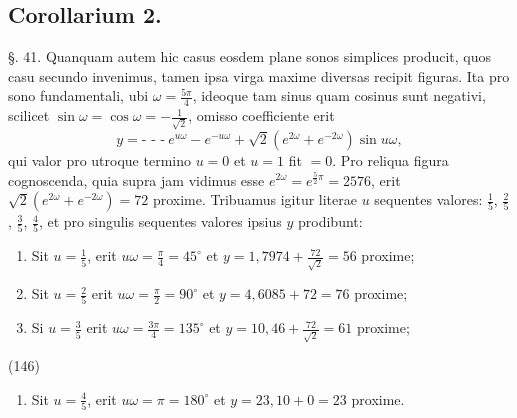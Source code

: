 \documentclass[11pt,a4paper]{article}
\begin{document}
\subsection{Corollarium 2.}

§. 41. Quanquam autem hic casus eosdem plane sonos simplices
producit, quos casu secundo invenimus, tamen ipsa virga maxime
diversas recipit figuras. Ita pro sono fundamentali, ubi $\omega=\frac{5\pi}{4}$,
ideoque tam sinus quam cosinus sunt negativi, scilicet $\sin \omega=\cos\omega
=-\frac{1}{\surd 2}$, omisso coefficiente erit
\[ y=\text{- - -}\ e^{u\omega}-e^{-u\omega}+\surd 2(e^{2\omega}+e^{-2\omega})\sin u\omega, \]
qui valor pro utroque termino $u=0$ et $u=1$ fit $=0$.
Pro reliqua figura cognoscenda, quia supra jam vidimus
esse $e^{2\omega}=e^{\frac{5}{2}\pi}=2576$, erit $\surd 2(e^{2\omega}+e^{-2\omega})=72$ proxime. Tribuamus
igitur literae $u$ sequentes valores: $\frac{1}{5}$, $\frac{2}{5}$, $\frac{3}{5}$, $\frac{4}{5}$, et pro singulis
sequentes valores ipsius $y$ prodibunt:

\begin{enumerate}
\item[I.] Sit $u=\frac{1}{5}$, erit $u\omega=\frac{\pi}{4}=45^{\circ}$ et $y=1,7974+\frac{72}{\surd 2}=56$ proxime;
\item[II.] Sit $u=\frac{2}{5}$ erit $u\omega=\frac{\pi}{2}=90^{\circ}$ et $y=4,6085+72=76$ proxime;
\item[III.] Si $u=\frac{3}{5}$ erit $u\omega=\frac{3\pi}{4}=135^{\circ}$ et $y=10,46+\frac{72}{\surd 2}=61$ proxime;
\end{enumerate}

(146)

\begin{enumerate}
\item[IV.] Sit $u=\frac{4}{5}$, erit $u\omega=\pi=180^{\circ}$ et $y=23,10+0=23$ proxime.
\end{enumerate}
\end{document}
